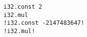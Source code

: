 {\begin{code}
\begin{minipage}[b]{0.32\linewidth}
\begin{minipage}[t]{0.46\linewidth}
            \begin{lstlisting}
i32.const 2
i32.mul
!i32.const -2147483647!
!i32.mul!
            \end{lstlisting}
        \end{minipage}
    \end{minipage}
    \end{code}
}

% 



% 




%



